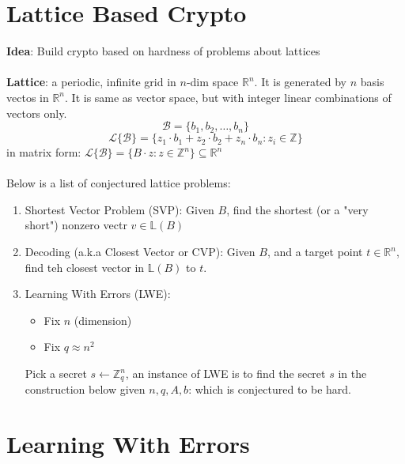 \documentclass{scribe}
\begin{document}
\section{Lattice Based Crypto}
\textbf{Idea}: Build crypto based on hardness of problems about lattices
\\\\
\textbf{Lattice}: a periodic, infinite grid in $n$-dim space $\mathbb{R}^n$. It is generated by $n$ basis vectos in $\mathbb{R}^n$. It is same as vector space, but with integer linear combinations of vectors only.
\[ \mathcal{B} = \{b_1,b_2, \dots, b_n\}\]
\[ \mathcal{L\{\mathcal{B}\}} = \{z_1 \cdot b_1+z_2 \cdot b_2+z_n \cdot b_n:z_i \in \mathbb{Z}\}\]
in matrix form: $\mathcal{L\{\mathcal{B}\}} = \{B\cdot z: z\in \mathbb{Z}^n\} \subseteq \mathbb{R}^n$
\\\\
Below is a list of conjectured lattice problems:
\begin{enumerate}
    \item Shortest Vector Problem (SVP): Given $B$, find the shortest (or a "very short") nonzero vectr $v \in \mathbb{L}(B)$
    \item Decoding (a.k.a Closest Vector or CVP): Given $B$, and a target point $t \in \mathbb{R}^n$, find teh closest vector in $\mathbb{L}(B)$ to $t$.
    \item Learning With Errors (LWE):\\
            \begin{itemize}
                \item Fix $n$ (dimension)
                \item Fix $q \approx n^2$
            \end{itemize}
            Pick a secret $s \leftarrow \mathbb{Z}_q^n$, an instance of LWE is to find the secret $s$ in the construction below given $n,q,A,b$:
            which is conjectured to be hard.
\end{enumerate}
\section{Learning With Errors}
\end{document}
